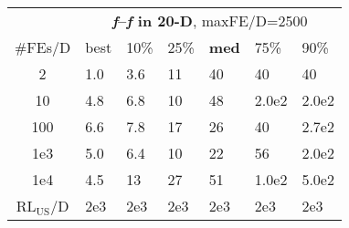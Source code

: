 \begin{tabular}{c|llllll}
 & \multicolumn{6}{|c}{\textbf{\textit{f}\raisebox{-0.35ex}{1}--\textit{f}\raisebox{-0.35ex}{24} in 20-D}, maxFE/D=2500}\\
\#FEs/D & best & 10\% & 25\% & \textbf{med} & 75\% & 90\%\\
2 & \hspace*{1ex}1.0 & \hspace*{1ex}3.6 & 11 & 40 & 40 & 40\\
10 & \hspace*{1ex}4.8 & \hspace*{1ex}6.8 & 10 & 48 & 2.0e2 & 2.0e2\\
100 & \hspace*{1ex}6.6 & \hspace*{1ex}7.8 & 17 & 26 & 40 & 2.7e2\\
1e3 & \hspace*{1ex}5.0 & \hspace*{1ex}6.4 & 10 & 22 & 56 & 2.0e2\\
1e4 & \hspace*{1ex}4.5 & 13 & 27 & 51 & 1.0e2 & 5.0e2\\
$\text{RL}_{\text{US}}$/D & 2e3 & 2e3 & 2e3 & 2e3 & 2e3 & 2e3
\end{tabular}
